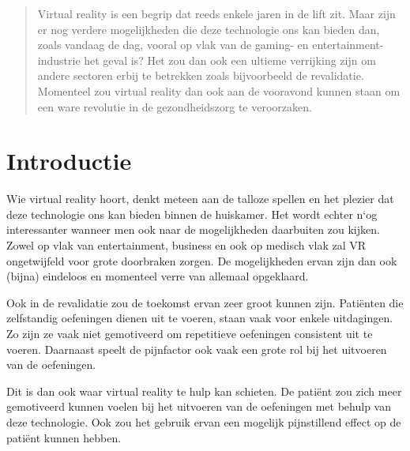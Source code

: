 \documentclass[a0,portrait]{a0poster}
\begin{document}
\begin{multicols}{2} %


\color{HoGentAccent1} %

\begin{abstract}
Virtual reality is een begrip dat reeds enkele jaren in de lift zit. Maar zijn er nog verdere mogelijkheden die deze
technologie ons kan bieden dan, zoals vandaag de dag, vooral op vlak van de gaming- en entertainment-industrie
het geval is? Het zou dan ook een ultieme verrijking zijn om andere sectoren erbij te betrekken zoals bijvoorbeeld
de revalidatie. Momenteel zou virtual reality dan ook aan de vooravond kunnen staan om een ware revolutie in de
gezondheidszorg te veroorzaken.
\end{abstract}

\color{HoGentAccent1} 
\section*{Introductie}
\color{black}
\color{black}
Wie virtual reality hoort, denkt meteen aan de talloze spellen en het plezier dat deze technologie ons
kan bieden binnen de huiskamer. Het wordt echter n`og interessanter wanneer men ook naar de mogelijkheden
daarbuiten zou kijken. Zowel op vlak van entertainment, business en ook op medisch
vlak zal VR ongetwijfeld voor grote doorbraken zorgen. De mogelijkheden ervan zijn dan ook (bijna)
eindeloos en momenteel verre van allemaal opgeklaard.

Ook in de revalidatie zou de toekomst ervan zeer groot kunnen zijn. Patiënten die zelfstandig oefeningen
dienen uit te voeren, staan vaak voor enkele uitdagingen. Zo zijn ze vaak niet gemotiveerd
om repetitieve oefeningen consistent uit te voeren. Daarnaast speelt de pijnfactor ook vaak een grote
rol bij het uitvoeren van de oefeningen.

Dit is dan ook waar virtual reality te hulp kan schieten. De patiënt zou zich meer gemotiveerd kunnen
voelen bij het uitvoeren van de oefeningen met behulp van deze technologie. Ook zou het gebruik
ervan een mogelijk pijnstillend effect op de patiënt kunnen hebben.


\end{multicols}
\end{document}
